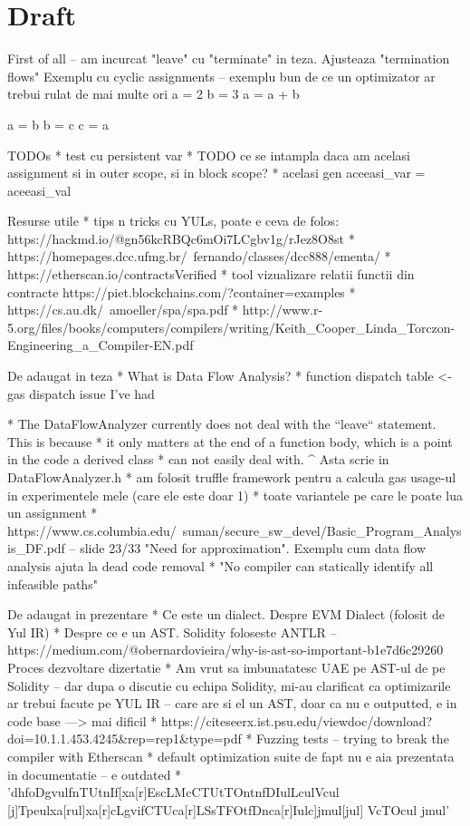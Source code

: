 \chapter*{Draft} 



First of all – am incurcat "leave" cu "terminate" in teza. Ajusteaza "termination flows"
Exemplu cu cyclic assignments – exemplu bun de ce un optimizator ar trebui rulat de mai multe ori
  a = 2
  b = 3
  a = a + b

  a = b
  b = c
  c = a


TODOs
* test cu persistent var
* TODO ce se intampla daca am acelasi assignment si in outer scope, si in block scope?
* acelasi gen aceeasi_var = aceeasi_val

Resurse utile
* tips n tricks cu YULs, poate e ceva de folos: https://hackmd.io/@gn56kcRBQc6mOi7LCgbv1g/rJez8O8st
* https://homepages.dcc.ufmg.br/~fernando/classes/dcc888/ementa/
* https://etherscan.io/contractsVerified
* tool vizualizare relatii functii din contracte https://piet.blockchains.com/?container=examples%
* https://cs.au.dk/~amoeller/spa/spa.pdf
* http://www.r-5.org/files/books/computers/compilers/writing/Keith_Cooper_Linda_Torczon-Engineering_a_Compiler-EN.pdf


De adaugat in teza
* What is Data Flow Analysis?
* function dispatch table <- gas dispatch issue I've had

  * The DataFlowAnalyzer currently does not deal with the ``leave`` statement. This is because
  * it only matters at the end of a function body, which is a point in the code a derived class
  * can not easily deal with.
  ^ Asta scrie in DataFlowAnalyzer.h
* am folosit truffle framework pentru a calcula gas usage-ul in experimentele mele (care ele este doar 1)
* toate variantele pe care le poate lua un assignment
* https://www.cs.columbia.edu/~suman/secure_sw_devel/Basic_Program_Analysis_DF.pdf – slide 23/33 "Need for approximation". Exemplu cum data flow analysis ajuta la dead code removal
  * "No compiler can statically identify all infeasible paths"


De adaugat in prezentare
* Ce este un dialect. Despre EVM Dialect (folosit de Yul IR)
* Despre ce e un AST. Solidity foloseste ANTLR – https://medium.com/@obernardovieira/why-is-ast-so-important-b1e7d6c29260
Proces dezvoltare dizertatie
* Am vrut sa imbunatatesc UAE pe AST-ul de pe Solidity – dar dupa o discutie cu echipa Solidity, mi-au clarificat ca optimizarile ar trebui facute pe YUL IR – care are si el un AST, doar ca nu e outputted, e in code base ---> mai dificil
* https://citeseerx.ist.psu.edu/viewdoc/download?doi=10.1.1.453.4245&rep=rep1&type=pdf 
* Fuzzing tests – trying to break the compiler with Etherscan
* default optimization suite de fapt nu e aia prezentata in documentatie – e outdated
  * 'dhfoDgvulfnTUtnIf[xa[r]EscLMcCTUtTOntnfDIulLculVcul [j]Tpeulxa[rul]xa[r]cLgvifCTUca[r]LSsTFOtfDnca[r]Iulc]jmul[jul] VcTOcul jmul'

